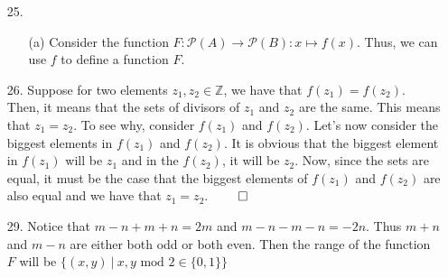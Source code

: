 \documentclass[12pt, a4paper]{article}
\newcommand{\ints}{\mathbb{Z}}
\newcommand{\rarr}{\rightarrow}
\begin{document}
\begin{itemize}
\item[]
\item[]

\item[25.]
\begin{itemize}
\item[(a)]
Consider the function $F : \mathcal{P}(A) \rarr \mathcal{P}(B) : x \mapsto f(x)$.
Thus, we can use $f$ to define a function $F$.
\end{itemize}

\item[]
\item[]

\item[26.]
Suppose for two elements $z_1, z_2 \in \ints$, we have that $f(z_1) = f(z_2)$.
Then, it means that the sets of divisors of $z_1$ and $z_2$ are the same. This means that $z_1 = z_2$.
To see why, consider $f(z_1)$ and $f(z_2)$. Let's now consider the biggest elements in $f(z_1)$ and $f(z_2)$.
It is obvious that the biggest element in $f(z_1)$ will be $z_1$ and in the $f(z_2)$, it will be $z_2$.
Now, since the sets are equal, it must be the case that the biggest elements of $f(z_1)$ and $f(z_2)$ are also
equal and we have that $z_1 = z_2$.
$\qed$

\item[]
\item[]

\item[29.]
Notice that $m - n + m + n = 2m$ and $m - n - m - n = -2n$. Thus $m + n$
and $m - n$ are either both odd or both even. Then the range of the function $F$
will be $\{(x, y) \ | \ x, y \mbox{ mod } 2 \in \{0, 1\} \}$\\\\
\end{itemize}
\end{document}
